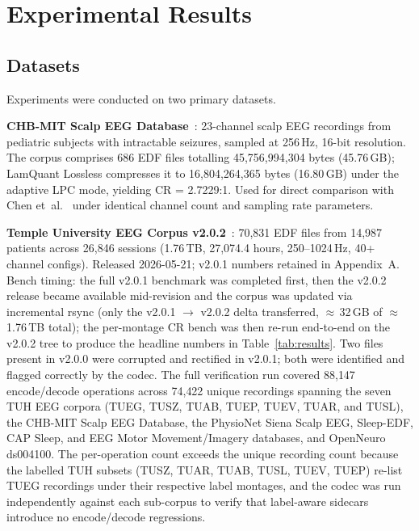 \documentclass[journal]{IEEEtran}
\begin{document}
\section{Experimental Results}
\label{sec:results}

\subsection{Datasets}
Experiments were conducted on two primary datasets.

\textbf{CHB-MIT Scalp EEG Database}~\cite{shoeb2009}: 23-channel
scalp EEG recordings from pediatric subjects with intractable
seizures, sampled at 256\,Hz, 16-bit resolution. The corpus
comprises 686 EDF files totalling 45,756,994,304 bytes (45.76\,GB);
LamQuant Lossless compresses it to 16,804,264,365 bytes
(16.80\,GB) under the adaptive LPC mode, yielding CR = 2.7229:1.
Used for direct comparison with Chen et~al.~\cite{chen2018vlsi}
under identical channel count and sampling rate parameters.

\textbf{Temple University EEG Corpus v2.0.2}~\cite{obeid2016,
tueg_aareadme_v202}: 70{,}831 EDF files from 14{,}987 patients
across 26{,}846 sessions (1.76\,TB, 27{,}074.4 hours,
250--1024\,Hz, 40+ channel configs). Released 2026-05-21;
v2.0.1 numbers retained in Appendix~A.
Bench timing: the full v2.0.1 benchmark was completed first, then
the v2.0.2 release became available mid-revision and the corpus
was updated via incremental rsync (only the v2.0.1 $\to$ v2.0.2
delta transferred, $\approx$\,32\,GB of $\approx$\,1.76\,TB
total); the per-montage CR bench was then re-run end-to-end on
the v2.0.2 tree to produce the headline numbers in
Table~\ref{tab:results}. Two files present in v2.0.0
were corrupted and rectified in v2.0.1; both were identified and
flagged correctly by the codec. The full verification run covered
88{,}147 encode/decode operations across 74{,}422 unique recordings
spanning the seven TUH EEG corpora (TUEG, TUSZ, TUAB, TUEP, TUEV,
TUAR, and TUSL), the CHB-MIT Scalp EEG Database, the
PhysioNet Siena Scalp EEG, Sleep-EDF, CAP Sleep, and EEG Motor
Movement/Imagery databases, and OpenNeuro ds004100. The per-operation
count exceeds the unique recording count because the labelled TUH
subsets (TUSZ, TUAR, TUAB, TUSL, TUEV, TUEP) re-list TUEG recordings
under their respective label montages, and the codec was run
independently against each sub-corpus to verify that label-aware
sidecars introduce no encode/decode regressions.
\end{document}

